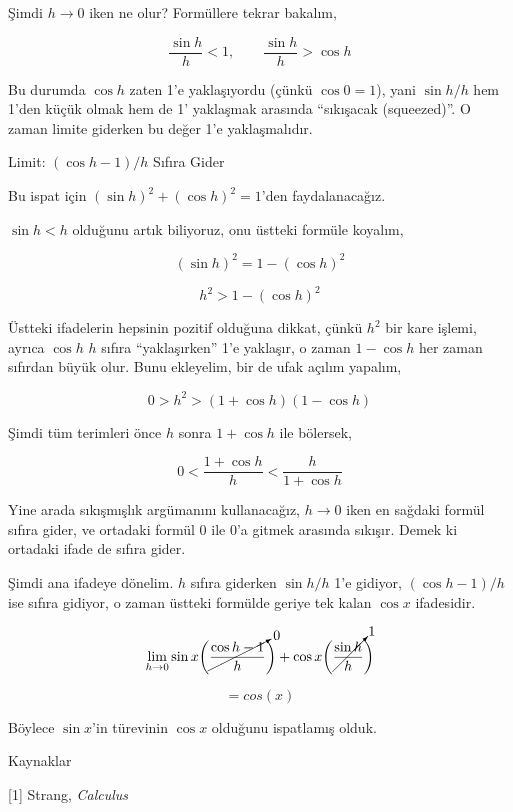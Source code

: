 \documentclass[12pt,fleqn]{article}\usepackage{../../common}
\begin{document}
Şimdi $h \to 0$ iken ne olur? Formüllere tekrar bakalım,

$$ \frac{\sin h}{h} < 1, \qquad  \frac{\sin h}{h} > \cos h $$

Bu durumda $\cos h$ zaten 1'e yaklaşıyordu (çünkü $\cos 0 = 1$), yani $\sin h
/ h$ hem 1'den küçük olmak hem de 1' yaklaşmak arasında ``sıkışacak
(squeezed)''. O zaman limite giderken bu değer 1'e yaklaşmalıdır.

Limit: $(\cos h -1) / h$ Sıfıra Gider

Bu ispat için $(\sin h)^2 + (\cos h)^2 = 1$'den faydalanacağız. 

$\sin h < h$ olduğunu artık biliyoruz, onu üstteki formüle koyalım,

$$ (\sin h)^2 = 1 -  (\cos h)^2$$

$$ h^2 > 1 -  (\cos h)^2$$

Üstteki ifadelerin hepsinin pozitif olduğuna dikkat, çünkü $h^2$ bir kare
işlemi, ayrıca $\cos h$ $h$ sıfıra ``yaklaşırken'' 1'e yaklaşır, o zaman
$1-\cos h$ her zaman sıfırdan büyük olur. Bunu ekleyelim, bir de ufak
açılım yapalım,

$$ 0 > h^2 > (1 + \cos h)(1 - \cos h)$$

Şimdi tüm terimleri önce $h$ sonra $1+\cos h$ ile bölersek, 

$$ 0 < \frac{1 + \cos h}{h} <  \frac{h}{1+\cos h} $$

Yine arada sıkışmışlık argümanını kullanacağız, $h \to 0$ iken en sağdaki
formül sıfıra gider, ve ortadaki formül 0 ile 0'a gitmek arasında
sıkışır. Demek ki ortadaki ifade de sıfıra gider.

Şimdi ana ifadeye dönelim. $h$ sıfıra giderken $\sin h/h$ 1'e gidiyor,
$(\cos h-1)/h$ ise sıfıra gidiyor, o zaman üstteki formülde geriye tek
kalan $\cos x$ ifadesidir. 

$$ \lim_{h \to 0}  
\sin x \bigg( \cancelto{0}{\frac{\cos h - 1}{h}} \bigg) + 
\cos x \bigg( \cancelto{1}{\frac{\sin h}{h}} \bigg)
$$

$$ = cos(x) $$

Böylece $\sin x$'in türevinin $\cos x$ olduğunu ispatlamış olduk.

Kaynaklar

[1] Strang, {\em Calculus}
\end{document}
